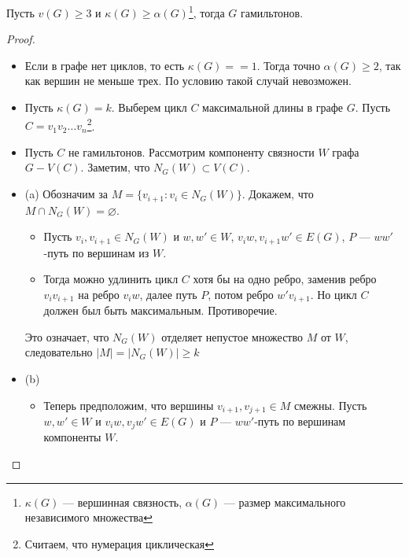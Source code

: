 \begin{theorem}
	Пусть $v(G) \ge 3$ и $\kappa(G) \ge \alpha(G)$\footnote{$\kappa(G)$ --- вершинная связность, $\alpha(G)$ --- размер максимального независимого множества}, тогда $G$ гамильтонов.
\end{theorem}
\begin{proof}
    \begin{itemize}
		\item Если в графе нет циклов, то есть $\kappa(G) == 1$. Тогда точно $\alpha(G) \ge 2$, так как вершин не меньше трех. По условию такой случай невозможен.
		\item Пусть $\kappa(G) = k$. Выберем цикл $C$ максимальной длины в графе $G$. Пусть  $C = v_1v_2\ldots v_n$\footnote{Считаем, что нумерация циклическая}.
		\item Пусть $C$ не гамильтонов. Рассмотрим компоненту связности $W$ графа $G - V(C)$. Заметим, что $N_G(W) \subset V(C)$.
				\begin{figure}[ht]
					\centering
					\begin{subfigure}{0.48\linewidth}
						\centering
						\caption{}
						\label{fig:thm-khvatal-ehrdesh}
					\end{subfigure}
					\begin{subfigure}{0.48\linewidth}
						\centering
						\caption{}
						\label{fig:thm-khvatal-ehrdesh-2}
					\end{subfigure}
				\end{figure}
		\item (a) Обозначим за $M = \{v_{i+1}\colon v_i \in N_{G}(W)\}$. Докажем, что $M \cap N_G(W) = \varnothing$.
			\begin{itemize}
				\item Пусть $v_i, v_{i+1} \in  N_G(W)$ и $w, w' \in  W$, $v_iw, v_{i+1}w' \in  E(G)$, $P$ --- $ww'$-путь по вершинам из $W$.
				\item Тогда можно удлинить цикл $C$ хотя бы на одно ребро, заменив ребро $v_iv_{i+1}$ на ребро $v_iw$, далее путь $P$, потом ребро $w'v_{i+1}$. Но цикл $C$ должен был быть максимальным. Противоречие. 
			\end{itemize}
			Это означает, что $N_G(W)$ отделяет непустое множество $M$ от $W$, следовательно $\lvert M \rvert = \lvert N_G(W) \rvert \ge k$
		\item (b)
			\begin{itemize}
				\item Теперь предположим, что вершины $v_{i+1}, v_{j+1} \in  M$ смежны. Пусть $w, w' \in W$ и $v_iw, v_jw' \in E(G)$ и $P$ --- $ww'$-путь по вершинам компоненты $W$.

\end{itemize}
\end{itemize}
\end{proof}

